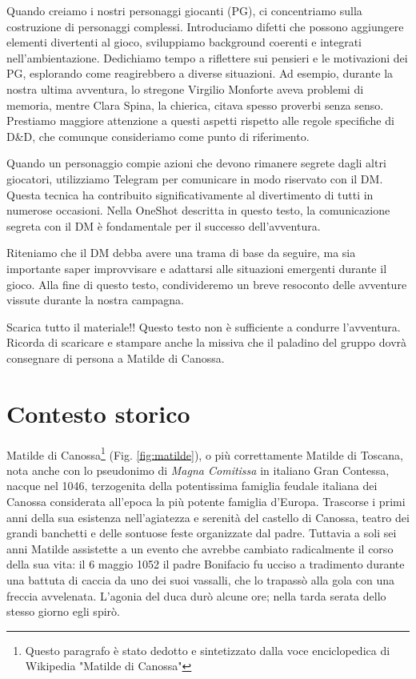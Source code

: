 \documentclass[letterpaper,twocolumn,openany,nodeprecatedcode]{dndbook}
\begin{document}
Quando creiamo i nostri personaggi giocanti (PG), ci concentriamo sulla costruzione di personaggi complessi. Introduciamo difetti che possono aggiungere elementi divertenti al gioco, sviluppiamo background coerenti e integrati nell'ambientazione. Dedichiamo tempo a riflettere sui pensieri e le motivazioni dei PG, esplorando come reagirebbero a diverse situazioni. Ad esempio, durante la nostra ultima avventura, lo stregone Virgilio Monforte aveva problemi di memoria, mentre Clara Spina, la chierica, citava spesso proverbi senza senso. Prestiamo maggiore attenzione a questi aspetti rispetto alle regole specifiche di D\&D, che comunque consideriamo come punto di riferimento.

Quando un personaggio compie azioni che devono rimanere segrete dagli altri giocatori, utilizziamo Telegram per comunicare in modo riservato con il DM. Questa tecnica ha contribuito significativamente al divertimento di tutti in numerose occasioni. Nella OneShot descritta in questo testo, la comunicazione segreta con il DM è fondamentale per il successo dell'avventura.

Riteniamo che il DM debba avere una trama di base da seguire, ma sia importante saper improvvisare e adattarsi alle situazioni emergenti durante il gioco. Alla fine di questo testo, condivideremo un breve resoconto delle avventure vissute durante la nostra campagna.

\begin{DndSidebar}{Scarica tutto il materiale!!}
Questo testo non è sufficiente a condurre l'avventura. Ricorda di scaricare e stampare anche la missiva che il paladino del gruppo dovrà consegnare di persona a Matilde di Canossa.
\end{DndSidebar}



\section{Contesto storico}

Matilde di Canossa\footnote{Questo paragrafo è stato dedotto e sintetizzato dalla voce enciclopedica di Wikipedia "Matilde di Canossa"} (Fig. \ref{fig:matilde})\cite{wiki:matilde}, o più correttamente Matilde di Toscana, nota anche con lo pseudonimo di \textit{Magna Comitissa} in italiano Gran Contessa, nacque nel 1046, terzogenita della potentissima famiglia feudale italiana dei Canossa considerata all'epoca la più potente famiglia d'Europa. Trascorse i primi anni della sua esistenza nell'agiatezza e serenità del castello di Canossa, teatro dei grandi banchetti e delle sontuose feste organizzate dal padre. Tuttavia a soli sei anni Matilde assistette a un evento che avrebbe cambiato radicalmente il corso della sua vita: il 6 maggio 1052 il padre Bonifacio fu ucciso a tradimento durante una battuta di caccia da uno dei suoi vassalli, che lo trapassò alla gola con una freccia avvelenata. L'agonia del duca durò alcune ore; nella tarda serata dello stesso giorno egli spirò.
\end{document}
